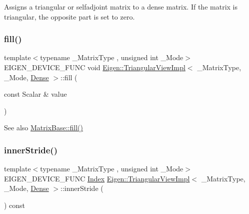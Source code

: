 Assigns a triangular or selfadjoint matrix to a dense matrix. If the matrix is triangular, the opposite part is set to zero. \mbox{\label{class_eigen_1_1_triangular_view_impl_3_01___matrix_type_00_01___mode_00_01_dense_01_4_ad4093c8ecb74b7eb0567d1161bcc9964}} 
\subsubsection{\texorpdfstring{fill()}{fill()}}
{\footnotesize\ttfamily template$<$typename \+\_\+\+Matrix\+Type , unsigned int \+\_\+\+Mode$>$ \\
E\+I\+G\+E\+N\+\_\+\+D\+E\+V\+I\+C\+E\+\_\+\+F\+U\+NC void \mbox{\hyperlink{class_eigen_1_1_triangular_view_impl}{Eigen\+::\+Triangular\+View\+Impl}}$<$ \+\_\+\+Matrix\+Type, \+\_\+\+Mode, \mbox{\hyperlink{struct_eigen_1_1_dense}{Dense}} $>$\+::fill (\begin{DoxyParamCaption}\item[{const Scalar \&}]{value }\end{DoxyParamCaption})\hspace{0.3cm}{\ttfamily [inline]}}

\begin{DoxySeeAlso}{See also}
\mbox{\hyperlink{class_eigen_1_1_dense_base_a4f5eb49e80db57f79a8353ecdf811418}{Matrix\+Base\+::fill()}} 
\end{DoxySeeAlso}
\mbox{\label{class_eigen_1_1_triangular_view_impl_3_01___matrix_type_00_01___mode_00_01_dense_01_4_aff17b6873e916ed22b8aadc14c2b1df9}} 
\subsubsection{\texorpdfstring{innerStride()}{innerStride()}}
{\footnotesize\ttfamily template$<$typename \+\_\+\+Matrix\+Type , unsigned int \+\_\+\+Mode$>$ \\
E\+I\+G\+E\+N\+\_\+\+D\+E\+V\+I\+C\+E\+\_\+\+F\+U\+NC \mbox{\hyperlink{struct_eigen_1_1_eigen_base_a554f30542cc2316add4b1ea0a492ff02}{Index}} \mbox{\hyperlink{class_eigen_1_1_triangular_view_impl}{Eigen\+::\+Triangular\+View\+Impl}}$<$ \+\_\+\+Matrix\+Type, \+\_\+\+Mode, \mbox{\hyperlink{struct_eigen_1_1_dense}{Dense}} $>$\+::inner\+Stride (\begin{DoxyParamCaption}{ }\end{DoxyParamCaption}) const\hspace{0.3cm}{\ttfamily [inline]}}

